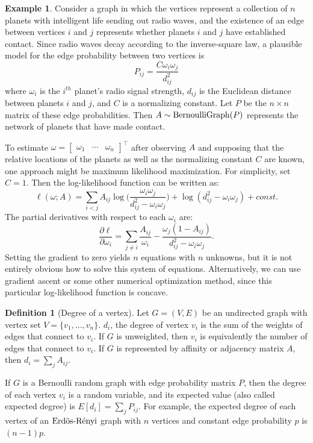 \documentclass[
  11pt,
]{article}
\theoremstyle{definition}
\newtheorem{definition}{Definition}[section]
\theoremstyle{definition}
\newtheorem{example}{Example}[section]
\theoremstyle{definition}
\theoremstyle{definition}
\theoremstyle{remark}
\begin{document}
\begin{example}
Consider a graph in which the vertices represent a collection of $n$ planets with intelligent life sending out radio waves, and the existence of an edge between vertices $i$ and $j$ represents whether planets $i$ and $j$ have established contact.  
Since radio waves decay according to the inverse-square law, a plausible model for the edge probability between two vertices is 
$$P_{ij} = \frac{C \omega_i \omega_j}{d_{ij}^2}$$ 
where $\omega_i$ is the $i^{th}$ planet's radio signal strength, $d_{ij}$ is the Euclidean distance between planets $i$ and $j$, and $C$ is a normalizing constant. 
Let $P$ be the $n \times n$ matrix of these edge probabilities. 
Then $A \sim \mathrm{BernoulliGraph}(P)$ represents the network of planets that have made contact. 

To estimate $\omega = \begin{bmatrix} \omega_1 & \cdots & \omega_n \end{bmatrix}^\top$ after observing $A$ and supposing that the relative locations of the planets as well as the normalizing constant $C$ are known, one approach might be maximum likelihood maximization. 
For simplicity, set $C = 1$. 
Then the log-likelihood function can be written as:
$$
\ell(\omega; A) = 
\sum_{i < j} A_{ij} \log \bigg( \frac{\omega_i \omega_j}{d_{ij}^2 -
\omega_i \omega_j} \bigg) + \log (d_{ij}^2 - \omega_i \omega_j) + const.
$$
The partial derivatives with respect to each $\omega_i$ are:
$$
\frac{\partial \ell}{\partial \omega_i} = \sum_{j \neq i} \frac{A_{ij}}{\omega_i} - \frac{\omega_j (1 - A_{ij})}{d_{ij}^2 - \omega_i \omega_j}.
$$
Setting the gradient to zero yields $n$ equations with $n$ unknowns, but it is not entirely obvious how to solve this system of equations. 
Alternatively, we can use gradient ascent or some other numerical optimization method, since this particular log-likelihood function is concave. 
\end{example}

\begin{definition}[Degree of a vertex]
\label{def:degree}
Let $G = (V, E)$ be an undirected graph with vertex set $V = \{v_1, ..., v_n\}$. 
$d_i$, the degree of vertex $v_i$ is the sum of the weights of edges that connect to $v_i$. 
If $G$ is unweighted, then $v_i$ is equivalently the number of edges that connect to $v_i$. 
If $G$ is represented by affinity or adjacency matrix $A$, then $d_i = \sum_j A_{ij}$. 

If $G$ is a Bernoulli random graph with edge probability matrix $P$, then the degree of each vertex $v_i$ is a random variable, and its expected value (also called expected degree) is $E[d_i] = \sum_j P_{ij}$. 
For example, the expected degree of each vertex of an $\text{Erd\"{o}s-R\'{e}nyi}$ graph with $n$ vertices and constant edge probability $p$ is $(n - 1) p$. 
\end{definition}
\end{document}
